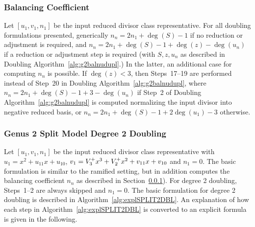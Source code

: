 \subsubsection{Balancing Coefficient}\label{sec:expldbl} Let $[u_1,v_1,n_1]$ be
the input reduced divisor class representative. For all doubling formulations
presented, generically $n_n = 2n_1 + \deg(S) - 1$ if no reduction or adjustment
is required, and $n_n = 2n_1 + \deg(S) - 1 + \deg(z) - \deg(u_n)$ if a reduction
or adjustment step is required (with $S,z,u_n$ as described in Doubling
Algorithm~\ref{alg:g2balnudupl}.) In the latter, an additional case for
computing $n_n$ is possible. If $\deg(z) < 3$, then Steps~17--19 are performed
instead of Step~20 in Doubling Algorithm~\ref{alg:g2balnudupl}, where $n_n =
2n_1 + \deg(S) - 1 + 3 - \deg(u_n)$ if Step~2 of Doubling
Algorithm~\ref{alg:g2balnudupl} is computed normalizing the input divisor into
negative reduced basis, or $n_n = 2n_1 + \deg(S) - 1 + 2\deg(u_1) - 3$
otherwise.


\subsubsection{Genus 2 Split Model Degree 2 Doubling}
Let $[u_1,v_1,n_1]$ be the input reduced divisor class representative with $u_1
= x^2 + u_{11}x + u_{10}$, $v_1 = V^{+}_3x^3 + V^{+}_2x^2 + v_{11}x + v_{10}$ and
$n_1 = 0$. The basic formulation is similar to the ramified setting, but in
addition computes the balancing coefficient $n_n$ as described in
Section~\ref{sec:expldbl}). For degree 2 doubling, Steps~1--2 are always skipped
and $n_1 = 0$. The basic formulation for degree 2 doubling is described in
Algorithm~\ref{alg:explSPLIT2DBL}. An explanation of how each step in
Algorithm~\ref{alg:explSPLIT2DBL} is converted to an explicit formula is given
in the following.

